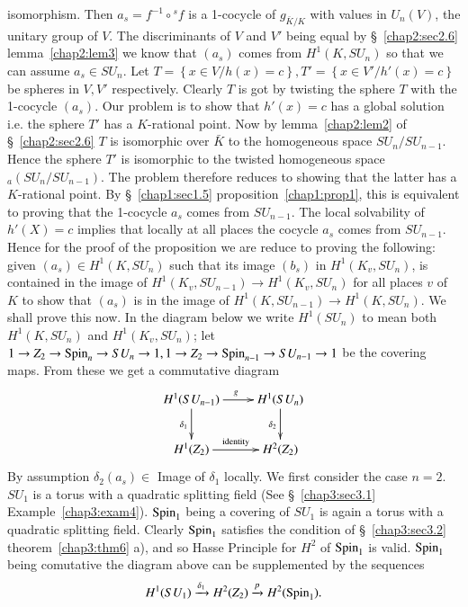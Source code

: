 isomorphism. Then $a_s = f^{-1} \circ {}^s f$ is a 1-cocycle of
$g_{\bar{K}/K}$ with 
values in $U_n(V)$, the unitary group of $V$. The discriminants of $V$
and $V'$ being equal by \S~\ref{chap2:sec2.6} lemma~\ref{chap2:lem3} 
we know that $(a_s)$ comes 
from $H^1(K,SU_n)$ so that we can assume $a_s \in SU_n$. Let $T= \left
\{ x\in V\bigg / h(x)=c \right \},T'= \left \{ x \in V' \bigg /h'
(x)=c \right \}$ be spheres in $V,V'$ respectively. Clearly $T$ is got
by twisting the sphere $T$ with the 1-cocycle $(a_s)$. Our problem
is to show that $h'(x)=c$ has a global solution i.e. the sphere $T'$
has a $K$-rational point. Now by lemma~\ref{chap2:lem2} of 
\S~\ref{chap2:sec2.6} $T$ is isomorphic 
over $\bar{K}$ to the homogeneous space $SU_n/SU_{n-1}$. Hence the
sphere $T'$ is isomorphic to the twisted homogeneous space
$_a(SU_n/SU_{n-1})$. The problem therefore reduces to showing that the
latter has a $K$-rational point. By \S~\ref{chap1:sec1.5}
proposition~\ref{chap1:prop1}, this is 
equivalent to proving that the 1-cocycle $a_s$ comes from
$SU_{n-1}$. The local solvability of $h'(X)=c$ implies that locally at
all places the cocycle $a_s$ comes from $SU_{n-1}$. Hence for the
proof of the proposition we are reduce to proving the following: given
$(a_s) \in H^1 (K,SU_n)$ such that its image $(b_s)$ in $H^1(K_v,SU_n)$,
is contained in the image of $H^1(K_v,SU_{n-1}) \to H^1(K_v,SU_n)$ for
all places $v$ of $K$ to show that $(a_s)$ is in the image of
$H^1(K,SU_{n-1})\to H^1(K,SU_n)$. We shall prove this\pageoriginale
now. In the 
diagram below we write $H^1(SU_n)$ to mean both $H^1(K,SU_n)$ and
$H^1(K_v,SU_n)$; let $1 \to Z_2 \to \operatorname{Spin}_n \to SU_n \to 1,1 \to Z_2
\to \operatorname{Spin}_{n-1} \to SU_{n-1} \to 1$  be the covering maps. From these
we get a commutative diagram 
\[
\xymatrix{
H^1 (SU_{n-1}) \ar[r]^g \ar[d]_{\delta_1} & H^1 (SU_n)
\ar[d]_{\delta_2} \\
H^1 (Z_2) \ar[r]^{\rm identity} & H^2 (Z_2)
}
\] 
By assumption $\delta_2(a_s) \in$ Image of $\delta_1$ locally. We first
consider the case $n=2$. $SU_1$ is a torus with a quadratic splitting
field (See \S~\ref{chap3:sec3.1} Example~\ref{chap3:exam4}). 
$\operatorname{Spin}_1$ being a covering of $SU_1$ 
is again a torus with a quadratic splitting field. Clearly $\operatorname{Spin}_1$
satisfies the condition of \S~\ref{chap3:sec3.2} 
theorem~\ref{chap3:thm6} a), and so Hasse 
Principle for $H^2$ of $\operatorname{Spin}_1$ is valid. $\operatorname{Spin}_1$ being comutative
the diagram above can be supplemented by the sequences  
$$
H^1(SU_1) \xrightarrow{{\delta}_1}  H^2 (Z_2) \xrightarrow{p} H^2 (\operatorname{Spin}_1).
$$
 
